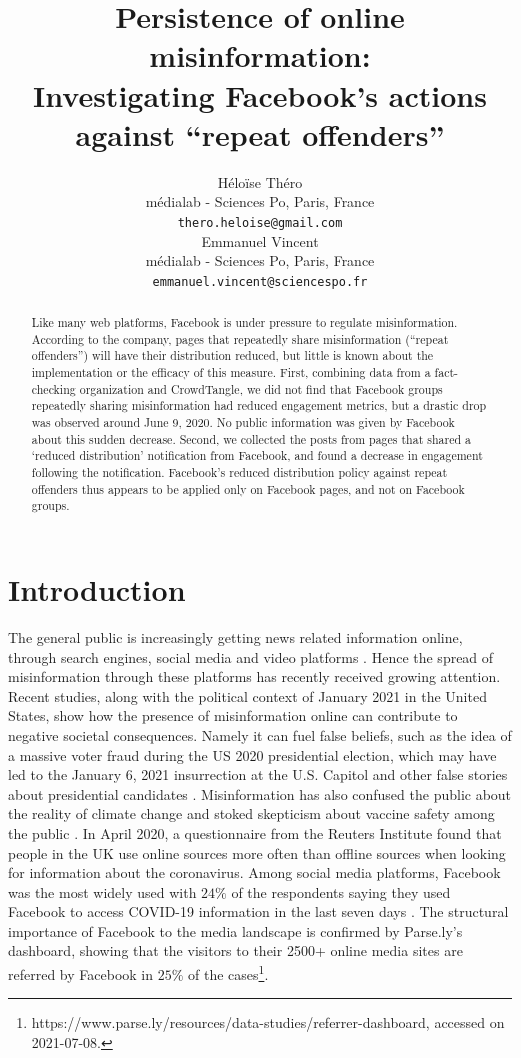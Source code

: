 \documentclass[11pt,a4paper]{article}
\title{Persistence of online misinformation: \\ Investigating Facebook's actions against ``repeat offenders''}
\author{Héloïse Théro \\
  médialab - Sciences Po, Paris, France \\
  \texttt{thero.heloise@gmail.com} \\\And
  Emmanuel Vincent \\
  médialab - Sciences Po, Paris, France \\
  \texttt{emmanuel.vincent@sciencespo.fr} \\}
\date{}
\begin{document}
\maketitle

\begin{abstract}
Like many web platforms, Facebook is under pressure to regulate misinformation. 
According to the company, pages that repeatedly share misinformation (“repeat offenders”) will have their distribution reduced, but little is known about the implementation or the efficacy of this measure.
First, combining data from a fact-checking organization and CrowdTangle, we did not find that Facebook groups repeatedly sharing misinformation had reduced engagement metrics, but a drastic drop was observed around June 9, 2020.
No public information was given by Facebook about this sudden decrease.
Second, we collected the posts from pages that shared a `reduced distribution' notification from Facebook, and found a decrease in engagement following the notification.
Facebook’s reduced distribution policy against repeat offenders thus appears to be applied only on Facebook pages, and not on Facebook groups.
\end{abstract}

\section{Introduction}

The general public is increasingly getting news related information online, through search engines, social media and video platforms \citep{mitchell2016modern}.
Hence the spread of misinformation through these platforms has recently received growing attention.
Recent studies, along with the political context of January 2021 in the United States, show how the presence of misinformation online can contribute to negative societal consequences.
Namely it can fuel false beliefs, such as the idea of a massive voter fraud during the US 2020 presidential election, which may have led to the January 6, 2021 insurrection at the U.S. Capitol \citep{benkler2020mail} and other false stories about presidential candidates \citep{allcott2017social}. 
Misinformation has also confused the public about the reality of climate change \citep{brulle30years, porter2019can} and stoked skepticism about vaccine safety among the public \citep{featherstone2020feeling, lahouati2020spread}. 
In April 2020, a questionnaire from the Reuters Institute found that people in the UK use online sources more often than offline sources when looking for information about the coronavirus. 
Among social media platforms, Facebook was the most widely used with $24\%$ of the respondents saying they used Facebook to access COVID-19 information in the last seven days \citep{fletcher2020information}. 
The structural importance of Facebook to the media landscape is confirmed by Parse.ly’s dashboard, showing that the visitors to their 2500+ online media sites are referred by Facebook in $25\%$ of the cases\footnote{https://www.parse.ly/resources/data-studies/referrer-dashboard, accessed on 2021-07-08.}.
\end{document}
